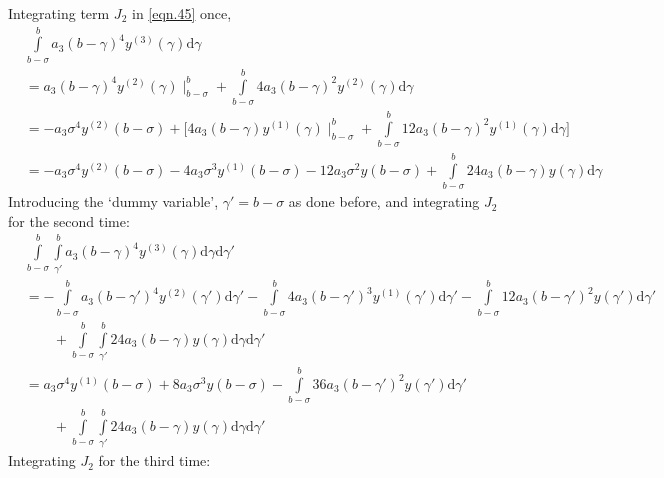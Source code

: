 \documentclass{article}
\begin{document}
Integrating term $J_2$ in \eqref{eqn.45} once,
\begin{equation}\label{eqn.61}
\begin{split}
	&\int\limits_{b-\sigma}^{b}a_3(b-\gamma)^4y^{(3)}(\gamma)\mathrm{d}\gamma\\
	&=a_3(b-\gamma)^{4}y^{(2)}(\gamma)\mid_{b-\sigma}^{b} + \int\limits_{b-\sigma}^{b}4a_3(b-\gamma)^{2}y^{(2)}(\gamma)\mathrm{d}\gamma\\
	&=-a_3\sigma^{4}y^{(2)}(b-\sigma) + \bigg[4a_3(b-\gamma)y^{(1)}(\gamma)\mid_{b-\sigma}^{b} + \int\limits_{b-\sigma}^{b}12a_3(b-\gamma)^{2}y^{(1)}(\gamma)\mathrm{d}\gamma\bigg]\\
	&=-a_3\sigma^{4}y^{(2)}(b-\sigma) - 4a_3\sigma^{3}y^{(1)}(b-\sigma) - 12a_3\sigma^{2}y(b-\sigma) + \int\limits_{b-\sigma}^{b}24a_3(b-\gamma)y(\gamma)\mathrm{d}\gamma
\end{split}
\end{equation}
Introducing the ‘dummy variable’, $\gamma'=b-\sigma$ as done before, and integrating $J_2$ for the second time:
\begin{equation}
\begin{split}
	&\int\limits_{b-\sigma}^{b}\int\limits_{\gamma'}^{b}a_3(b-\gamma)^{4}y^{(3)}(\gamma)\mathrm{d}\gamma\mathrm{d}\gamma'\\
	&=-\int\limits_{b-\sigma}^{b}a_3(b-\gamma')^{4}y^{(2)}(\gamma')\mathrm{d}\gamma' - \int\limits_{b-\sigma}^{b}4a_3(b-\gamma')^{3}y^{(1)}(\gamma')\mathrm{d}\gamma' - \int\limits_{b-\sigma}^{b}12a_3(b-\gamma')^{2}y(\gamma')\mathrm{d}\gamma'\\
	&\qquad{} + \int\limits_{b-\sigma}^{b}\int\limits_{\gamma'}^{b}24a_3(b-\gamma)y(\gamma)\mathrm{d}\gamma\mathrm{d}\gamma'\\
	&=a_3\sigma^{4}y^{(1)}(b-\sigma) + 8a_3\sigma^{3}y(b-\sigma) - \int\limits_{b-\sigma}^{b}36a_3(b-\gamma')^{2}y(\gamma')\mathrm{d}\gamma'\\
	 &\qquad{} + \int\limits_{b-\sigma}^{b}\int\limits_{\gamma'}^{b}24a_3(b-\gamma)y(\gamma)\mathrm{d}\gamma\mathrm{d}\gamma'
\end{split}
\end{equation}
Integrating $J_2$ for the third time:
\end{document}
